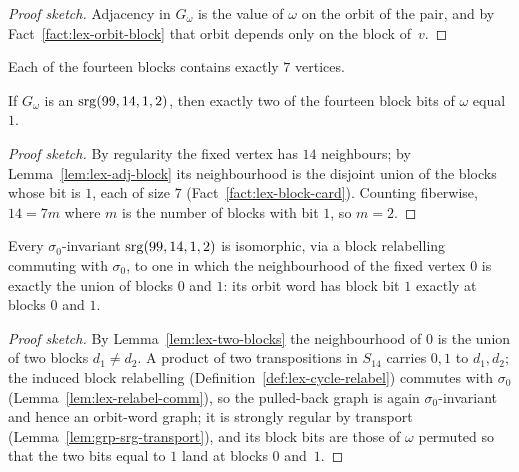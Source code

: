 \begin{proof}[Proof sketch]
Adjacency in $G_\omega$ is the value of $\omega$ on the orbit of the pair,
and by Fact~\ref{fact:lex-orbit-block} that orbit depends only on the block
of~$v$.
\end{proof}

\begin{fact}\label{fact:lex-block-card}
Each of the fourteen blocks contains exactly $7$ vertices.
\leanok
{}
\end{fact}

\begin{lemma}\label{lem:lex-two-blocks}
If $G_\omega$ is an $\mathrm{srg}(99,14,1,2)$, then exactly two of the fourteen
block bits of $\omega$ equal $1$.
\leanok
{}
\end{lemma}

\begin{proof}[Proof sketch]
By regularity the fixed vertex has $14$ neighbours; by
Lemma~\ref{lem:lex-adj-block} its neighbourhood is the disjoint union of the
blocks whose bit is $1$, each of size $7$
(Fact~\ref{fact:lex-block-card}).  Counting fiberwise, $14 = 7m$ where $m$
is the number of blocks with bit $1$, so $m = 2$.
\end{proof}

\begin{lemma}\label{lem:sym1}
Every $\sigma_0$-invariant $\mathrm{srg}(99,14,1,2)$ is isomorphic, via a block
relabelling commuting with $\sigma_0$, to one in which the neighbourhood of
the fixed vertex $0$ is exactly the union of blocks $0$ and $1$: its orbit
word has block bit $1$ exactly at blocks $0$ and $1$.
\leanok
{}
\end{lemma}

\begin{proof}[Proof sketch]
By Lemma~\ref{lem:lex-two-blocks} the neighbourhood of $0$ is the union of
two blocks $d_1 \neq d_2$.  A product of two transpositions in $S_{14}$
carries $0,1$ to $d_1,d_2$; the induced block relabelling
(Definition~\ref{def:lex-cycle-relabel}) commutes with $\sigma_0$
(Lemma~\ref{lem:lex-relabel-comm}), so the pulled-back graph is again
$\sigma_0$-invariant and hence an orbit-word graph; it is strongly regular
by transport (Lemma~\ref{lem:grp-srg-transport}), and its block bits are
those of $\omega$ permuted so that the two bits equal to $1$ land at blocks
$0$ and~$1$.
\end{proof}

